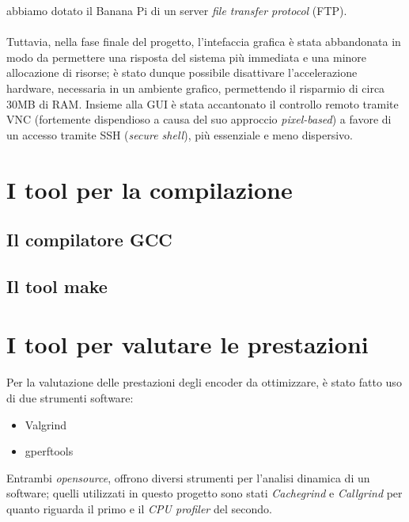 abbiamo dotato il Banana Pi di un server \emph{file transfer protocol} (FTP).
\\ \\ 
Tuttavia, nella fase finale del progetto, l'intefaccia grafica è stata 
abbandonata in modo da permettere una risposta del sistema più immediata e una 
minore allocazione di risorse; è stato dunque possibile disattivare 
l'accelerazione hardware, necessaria in un ambiente grafico, permettendo il 
risparmio di circa 30MB di RAM. Insieme alla GUI è stata accantonato il 
controllo remoto tramite VNC (fortemente dispendioso a causa del suo approccio 
\emph{pixel-based}) a favore di un accesso tramite SSH (\emph{secure shell}), 
più essenziale e meno dispersivo.


\section{I tool per la compilazione}


\subsection{Il compilatore GCC}


\subsection{Il tool make}


\section{I tool per valutare le prestazioni}
Per la valutazione delle prestazioni degli encoder da ottimizzare, è stato 
fatto uso di due strumenti software:
\begin{itemize}
\item Valgrind
\item gperftools
\end{itemize}
Entrambi \emph{opensource}, offrono diversi strumenti per l'analisi dinamica 
di un software; quelli utilizzati in questo progetto sono stati
\emph{Cachegrind} e \emph{Callgrind} per quanto riguarda il primo e il 
\emph{CPU profiler} del secondo.

